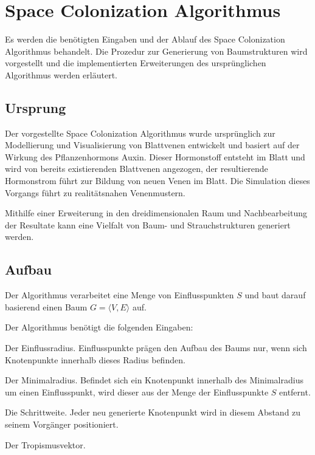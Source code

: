 \chapter{Space Colonization Algorithmus} \label{ch:SCA}

Es werden die benötigten Eingaben und der Ablauf des Space Colonization Algorithmus behandelt. Die Prozedur zur Generierung von Baumstrukturen wird vorgestellt und die implementierten Erweiterungen des ursprünglichen Algorithmus werden erläutert.

\section{Ursprung}
Der vorgestellte Space Colonization Algorithmus wurde ursprünglich zur Modellierung und Visualisierung von Blattvenen entwickelt und basiert auf der Wirkung des Pflanzenhormons Auxin. Dieser Hormonstoff entsteht im Blatt und wird von bereits existierenden Blattvenen angezogen, der resultierende Hormonstrom führt zur Bildung von neuen Venen im Blatt. Die Simulation dieses Vorgangs führt zu realitätsnahen Venenmustern. \cite[Abschn. 2.5]{LeafVenation:05}

Mithilfe einer Erweiterung in den dreidimensionalen Raum und Nachbearbeitung der Resultate kann eine Vielfalt von Baum- und Strauchstrukturen generiert werden. \cite[Abschn. 1]{SpaceColonizationAlgorithm:07}

\section{Aufbau}

Der Algorithmus verarbeitet eine Menge von Einflusspunkten $S$ und baut darauf basierend einen Baum $G = \langle V,E \rangle$ auf. 

Der Algorithmus benötigt die folgenden Eingaben:

\begin{description}[labelindent]
	\item[\boldmath$d_i$] Der Einflussradius. Einflusspunkte prägen den Aufbau des Baums nur, wenn sich Knotenpunkte innerhalb dieses Radius befinden. \cite[Abschn. 2]{SpaceColonizationAlgorithm:07}\\
	
	\item[\boldmath$d_k$] Der Minimalradius. Befindet sich ein Knotenpunkt innerhalb des Minimalradius um einen Einflusspunkt, wird dieser aus der Menge der Einflusspunkte $S$ entfernt. \cite[Abschn. 2]{SpaceColonizationAlgorithm:07}\\
	
	\item[\boldmath$D$] Die Schrittweite. Jeder neu generierte Knotenpunkt wird in diesem Abstand zu seinem Vorgänger positioniert. \cite[Abschn. 2]{SpaceColonizationAlgorithm:07} \\
	
	\item[\boldmath$\overrightarrow{T}$] Der Tropismusvektor. 

\end{description}

